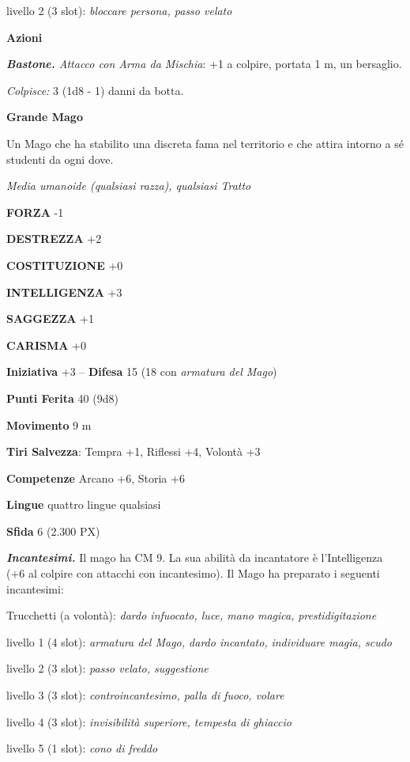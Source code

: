 \begin{multicols}{2}
	livello 2 (3 slot): \textit{bloccare persona, passo velato}

	\textbf{Azioni}

	\textit{\textbf{Bastone.} Attacco con Arma da Mischia}: +1 a colpire, portata 1 m, un bersaglio.

	\textit{Colpisce:} 3 (1d8 - 1) danni da botta.

	\medskip\textbf{Grande Mago}

	Un Mago che ha stabilito una discreta fama nel territorio e che attira intorno a sé studenti da ogni dove.

	\textit{Media umanoide (qualsiasi razza), qualsiasi Tratto}

	\textbf{FORZA} -1

	\textbf{DESTREZZA} +2

	\textbf{COSTITUZIONE} +0

	\textbf{INTELLIGENZA} +3

	\textbf{SAGGEZZA} +1

	\textbf{CARISMA} +0

	\textbf{Iniziativa} +3 -- \textbf{Difesa} 15 (18 con \textit{armatura del Mago})

	\textbf{Punti Ferita} 40 (9d8)

	\textbf{Movimento} 9 m

	\textbf{Tiri Salvezza}: Tempra +1, Riflessi +4, Volontà +3

	\textbf{Competenze} Arcano +6, Storia +6

	\textbf{Lingue} quattro lingue qualsiasi

	\textbf{Sfida} 6 (2.300 PX)

	\textit{\textbf{Incantesimi.}} Il mago ha CM 9. La sua abilità da incantatore è l'Intelligenza (+6 al colpire con attacchi con incantesimo). Il Mago ha preparato i seguenti incantesimi:

	Trucchetti (a volontà): \textit{dardo infuocato, luce, mano magica,}
	\textit{prestidigitazione}

	livello 1 (4 slot): \textit{armatura del Mago, dardo incantato,}
	\textit{individuare magia, scudo}

	livello 2 (3 slot): \textit{passo velato, suggestione}

	livello 3 (3 slot): \textit{controincantesimo, palla di fuoco, volare}

	livello 4 (3 slot): \textit{invisibilità superiore, tempesta di ghiaccio}

	livello 5 (1 slot): \textit{cono di freddo}


\end{multicols}
